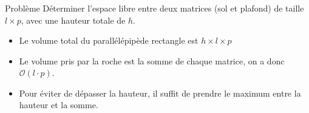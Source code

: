 \begin{frame}
    \frametitle{\problemtitle}
    \begin{block}{Problème}
        Déterminer l'espace libre entre deux matrices (sol et plafond) de taille $l \times p$, avec une hauteur totale de $h$.
    \end{block}
    \begin{itemize}
        \item<+-> Le volume total du parallélépipède rectangle est $h\times l\times p$
        \item<+-> Le volume pris par la roche est la somme de chaque matrice, on a donc $\mathcal{O}(l\cdot p)$.
        \item<+-> Pour éviter de dépasser la hauteur, il suffit de prendre le maximum entre la hauteur et la somme.
    \end{itemize}
\end{frame}
